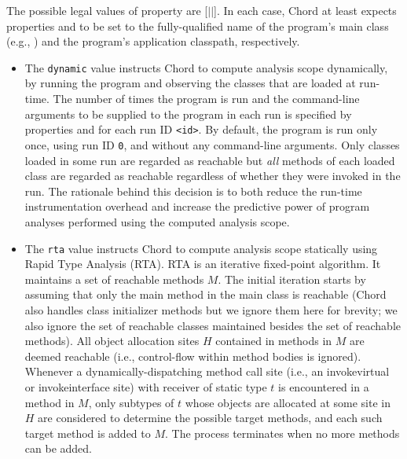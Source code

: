 The possible legal values of property  are
[$|$$|$].  In each case, Chord at
least expects properties  and
 to be set to the fully-qualified name of the
program's main class (e.g., ) and the
program's application classpath, respectively.

\begin{itemize}
\item
The {\tt dynamic} value instructs Chord to compute analysis scope
dynamically, by running the program and observing the
classes that are loaded at run-time.  The number of times the program
is run and the command-line arguments to be supplied to the program in
each run is specified by properties  and
 for each run ID {\tt <id>}.  By default, the
program is run only once, using run ID {\tt 0}, and without any
command-line arguments.  Only classes loaded in some run are regarded
as reachable but {\it all} methods of each loaded class are regarded
as reachable regardless of whether they were invoked in the run.  The
rationale behind this decision is to both reduce the run-time instrumentation
overhead and increase the predictive power of program analyses
performed using the computed analysis scope.

\item
The {\tt rta} value instructs Chord to compute analysis scope
statically using Rapid Type Analysis (RTA).
RTA is an iterative fixed-point algorithm.  It maintains a set of
reachable methods $M$.  The initial iteration starts by assuming that
only the main method in the main class is reachable (Chord also
handles class initializer methods but we ignore them here for brevity;
we also ignore the set of reachable classes maintained besides the set
of reachable methods).  All object allocation sites $H$ contained in
methods in $M$ are deemed reachable (i.e., control-flow within method
bodies is ignored).  Whenever a dynamically-dispatching method call
site (i.e., an invokevirtual or invokeinterface site) with receiver of
static type $t$ is encountered in a method in $M$, only subtypes of
$t$ whose objects are allocated at some site in $H$ are considered to
determine the possible target methods, and each such target method is
added to $M$.  The process terminates when no more methods can be
added.


\end{itemize}
